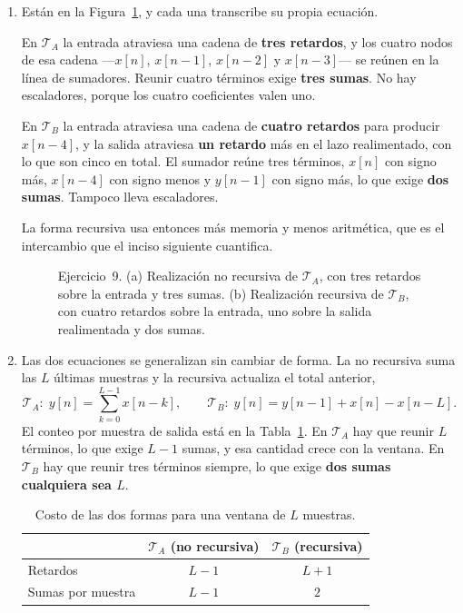 \documentclass[10pt,a4paper]{article}
\begin{document}
\begin{enumerate}
		\item Están en la Figura~\ref{fig:sol_ej9}, y cada
		una transcribe su propia ecuación.

		En $\mathcal{T}_A$ la entrada atraviesa una cadena de \textbf{tres retardos}, y los
		cuatro nodos de esa cadena ---$x[n]$, $x[n-1]$, $x[n-2]$ y $x[n-3]$--- se reúnen en
		la línea de sumadores. Reunir cuatro términos exige \textbf{tres sumas}. No hay
		escaladores, porque los cuatro coeficientes valen uno.

		En $\mathcal{T}_B$ la entrada atraviesa una cadena de \textbf{cuatro retardos} para
		producir $x[n-4]$, y la salida atraviesa \textbf{un retardo} más en el lazo
		realimentado, con lo que son cinco en total. El sumador reúne tres términos, $x[n]$
		con signo más, $x[n-4]$ con signo menos y $y[n-1]$ con signo más, lo que exige
		\textbf{dos sumas}. Tampoco lleva escaladores.

		La forma recursiva usa entonces más memoria y menos aritmética, que es el
		intercambio que el inciso siguiente cuantifica.

		\begin{figure}[H]
			\centering
			
			\caption{Ejercicio~9. (a) Realización no recursiva de $\mathcal{T}_A$, con tres
			retardos sobre la entrada y tres sumas. (b) Realización recursiva de
			$\mathcal{T}_B$, con cuatro retardos sobre la entrada, uno sobre la salida
			realimentada y dos sumas.}
			\label{fig:sol_ej9}
		\end{figure}

		\item Las dos ecuaciones se generalizan sin cambiar de
		forma. La no recursiva suma las $L$ últimas muestras y la recursiva actualiza el
		total anterior,
		\[
			\mathcal{T}_A: \; y[n] = \sum_{k=0}^{L-1} x[n-k],
			\qquad
			\mathcal{T}_B: \; y[n] = y[n-1] + x[n] - x[n-L].
		\]
		El conteo por muestra de salida está en la Tabla~\ref{tab:sol_ej8}. En
		$\mathcal{T}_A$ hay que reunir $L$ términos, lo que exige $L-1$ sumas, y esa cantidad
		crece con la ventana. En $\mathcal{T}_B$ hay que reunir tres términos siempre, lo que
		exige \textbf{dos sumas cualquiera sea $L$}.

		\begin{table}[H]
			\centering
			\caption{Costo de las dos formas para una ventana de $L$ muestras.}
			\label{tab:sol_ej8}
			\begin{tabular}{lcc}
				\toprule
				 & $\mathcal{T}_A$ (no recursiva) & $\mathcal{T}_B$ (recursiva) \\
				\midrule
				Retardos                & $L-1$ & $L+1$ \\
				Sumas por muestra       & $L-1$ & $2$   \\
				\bottomrule
			\end{tabular}
		\end{table}


\end{enumerate}
\end{document}
